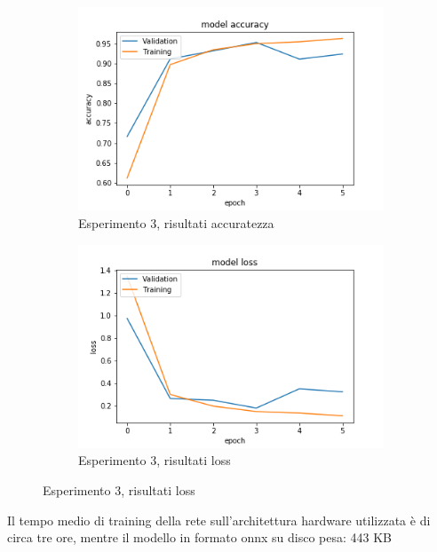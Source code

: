 \begin{figure}[H]
    \begin{subfigure}[b]{0.5\textwidth}
        \includegraphics[width=\textwidth]{./plots/exp3_p1_acc.png}
        \caption{Esperimento 3, risultati accuratezza} 
        \label{fig:plot_exp3_p1_acc}
    \end{subfigure}
    \begin{subfigure}[b]{0.5\textwidth}
        \includegraphics[width=\textwidth]{./plots/exp3_p1_loss.png}
        \caption{Esperimento 3, risultati loss} 
        \label{fig:plot_exp3_p1_loss}
	\end{subfigure}
\end{figure}

Il tempo medio di training della rete sull'architettura hardware utilizzata è di circa tre ore, mentre il modello in formato onnx su disco pesa: 443 KB

